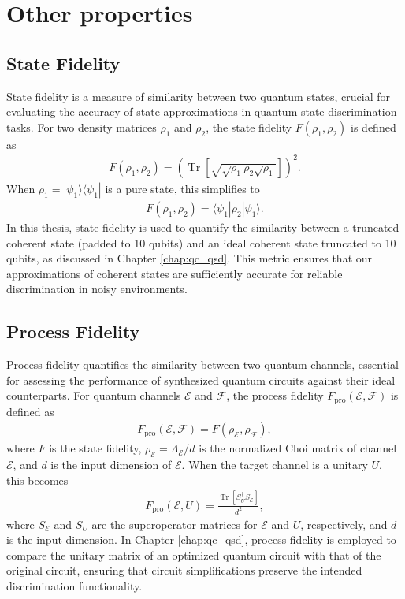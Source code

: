 \section{Other properties}
\subsection{State Fidelity}
\label{subsec:state_fid}
State fidelity is a measure of similarity between two quantum states, crucial
for evaluating the accuracy of state approximations in quantum state
discrimination tasks.
For two density matrices \(\rho_1\) and \(\rho_2\), the state fidelity
\(F(\rho_1, \rho_2)\) is defined as
\begin{align}
    F(\rho_1, \rho_2) = \left( \operatorname{Tr} \left[ \sqrt{\sqrt{\rho_1} \rho_2 \sqrt{\rho_1}} \right] \right)^2.
\end{align}
When \(\rho_1 = |\psi_1\rangle\langle\psi_1|\) is a pure state, this simplifies to
\begin{align}
    F(\rho_1, \rho_2) = \langle \psi_1 | \rho_2 | \psi_1 \rangle.
\end{align}
In this thesis, state fidelity is used to quantify the similarity between a
truncated coherent state (padded to 10 qubits) and an ideal coherent state
truncated to 10 qubits, as discussed in Chapter \ref{chap:qc_qsd}.
This metric ensures that our approximations of coherent states are
sufficiently accurate for reliable discrimination in noisy environments.

\subsection{Process Fidelity}
\label{subsec:proc_fid}
Process fidelity quantifies the similarity between two quantum channels,
essential for assessing the performance of synthesized quantum circuits
against their ideal counterparts.
For quantum channels \(\mathcal{E}\) and \(\mathcal{F}\), the process fidelity
\(F_{\text{pro}}(\mathcal{E}, \mathcal{F})\) is defined as
\begin{align}
    F_{\text{pro}}(\mathcal{E}, \mathcal{F}) = F(\rho_{\mathcal{E}}, \rho_{\mathcal{F}}),
\end{align}
where \(F\) is the state fidelity, \(\rho_{\mathcal{E}} = \Lambda_{\mathcal{E}} / d\)
is the normalized Choi matrix of channel \(\mathcal{E}\), and \(d\) is the
input dimension of \(\mathcal{E}\).
When the target channel is a unitary \(U\), this becomes
\begin{align}
    F_{\text{pro}}(\mathcal{E}, U) = \frac{\operatorname{Tr}[S_U^\dagger S_{\mathcal{E}}]}{d^2},
\end{align}
where \(S_{\mathcal{E}}\) and \(S_U\) are the superoperator matrices for
\(\mathcal{E}\) and \(U\), respectively, and \(d\) is the input dimension.
In Chapter \ref{chap:qc_qsd}, process fidelity is employed to compare the
unitary matrix of an optimized quantum circuit with that of the original
circuit, ensuring that circuit simplifications preserve the intended
discrimination functionality.
